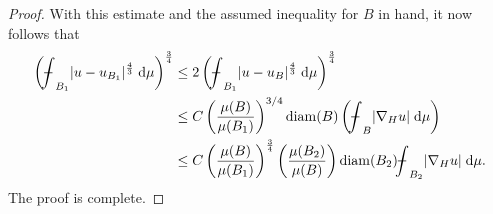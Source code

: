 \documentclass[10pt,letterpaper]{amsart}
\theoremstyle{definition}
\numberwithin{thm}{subsection}
\numberwithin{equation}{section}
\begin{document}
\begin{proof}
With this estimate and the assumed inequality for $B$ in hand, it now follows that
\begin{align*}
\left({\mathchoice
          {\mathop{\vrule width 6pt height 3 pt depth -2.5pt
                  \kern -8pt \intop}\nolimits_{{B_1}}}          {\mathop{\vrule width 5pt height 3 pt depth -2.6pt
                  \kern -6pt \intop}\nolimits_{{B_1}}}          {\mathop{\vrule width 5pt height 3 pt depth -2.6pt
                  \kern -6pt \intop}\nolimits_{{B_1}}}          {\mathop{\vrule width 5pt height 3 pt depth -2.6pt
                  \kern -6pt \intop}\nolimits_{{B_1}}}} |u-u_{B_1}|^{\frac{4}{3}}\;\mathrm{d}\mu\right)^{\frac{3}{4}}&\le 2 \left({\mathchoice
          {\mathop{\vrule width 6pt height 3 pt depth -2.5pt
                  \kern -8pt \intop}\nolimits_{{B_1}}}          {\mathop{\vrule width 5pt height 3 pt depth -2.6pt
                  \kern -6pt \intop}\nolimits_{{B_1}}}          {\mathop{\vrule width 5pt height 3 pt depth -2.6pt
                  \kern -6pt \intop}\nolimits_{{B_1}}}          {\mathop{\vrule width 5pt height 3 pt depth -2.6pt
                  \kern -6pt \intop}\nolimits_{{B_1}}}} |u-u_B|^{\frac{4}{3}}\;\mathrm{d}\mu\right)^{\frac{3}{4}}\\
&\le C \left( \frac{\mu(B)}{\mu(B_1)} \right)^{3/4} \mathrm{diam}(B) \left( {\mathchoice
          {\mathop{\vrule width 6pt height 3 pt depth -2.5pt
                  \kern -8pt \intop}\nolimits_{B}}          {\mathop{\vrule width 5pt height 3 pt depth -2.6pt
                  \kern -6pt \intop}\nolimits_{B}}          {\mathop{\vrule width 5pt height 3 pt depth -2.6pt
                  \kern -6pt \intop}\nolimits_{B}}          {\mathop{\vrule width 5pt height 3 pt depth -2.6pt
                  \kern -6pt \intop}\nolimits_{B}}} |\nabla_H u|\;\mathrm{d}\mu\right)\\
&\le C \left(\frac{ \mu(B)}{\mu(B_1)}\right)^{\frac{3}{4}} \left( \frac{\mu(B_2)}{\mu(B)} \right) \mathrm{diam}(B_2) {\mathchoice
          {\mathop{\vrule width 6pt height 3 pt depth -2.5pt
                  \kern -8pt \intop}\nolimits_{{B_2}}}          {\mathop{\vrule width 5pt height 3 pt depth -2.6pt
                  \kern -6pt \intop}\nolimits_{{B_2}}}          {\mathop{\vrule width 5pt height 3 pt depth -2.6pt
                  \kern -6pt \intop}\nolimits_{{B_2}}}          {\mathop{\vrule width 5pt height 3 pt depth -2.6pt
                  \kern -6pt \intop}\nolimits_{{B_2}}}} |\nabla_H u|\;\mathrm{d}\mu.
\end{align*}
The proof is complete.
\end{proof}
\end{document}
